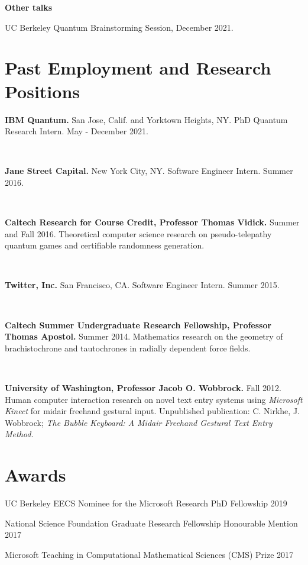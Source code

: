 \documentclass{article}
\begin{document}
\textbf{Other talks}

UC Berkeley Quantum Brainstorming Session, December 2021.







\section{Past Employment and Research Positions}

\textbf{IBM Quantum.}
San Jose, Calif. and Yorktown Heights, NY. PhD Quantum Research Intern. May - December 2021.

\

\textbf{Jane Street Capital.}
New York City, NY. Software Engineer Intern. Summer 2016. 

\

\textbf{Caltech Research for Course Credit, Professor Thomas Vidick.}
Summer and Fall 2016. Theoretical computer science research on pseudo-telepathy quantum games and certifiable randomness generation. 

\

\textbf{Twitter, Inc.}
San Francisco, CA. Software Engineer Intern. Summer 2015. 

\	

\textbf{Caltech Summer Undergraduate Research Fellowship, Professor Thomas Apostol.}
Summer 2014. Mathematics research on the geometry of brachistochrone and tautochrones in radially dependent force fields. 

\

\textbf{University of Washington, Professor Jacob O. Wobbrock.}
Fall 2012. Human computer interaction research on novel text entry systems using \emph{Microsoft Kinect} for midair freehand gestural input. Unpublished publication: C. Nirkhe, J. Wobbrock; \emph{The Bubble Keyboard: A Midair Freehand Gestural Text Entry Method.}

\section{Awards}
UC Berkeley EECS Nominee for the Microsoft Research PhD Fellowship 2019

National Science Foundation Graduate Research Fellowship Honourable Mention 2017 

Microsoft Teaching in Computational Mathematical Sciences (CMS) Prize 2017
\end{document}
